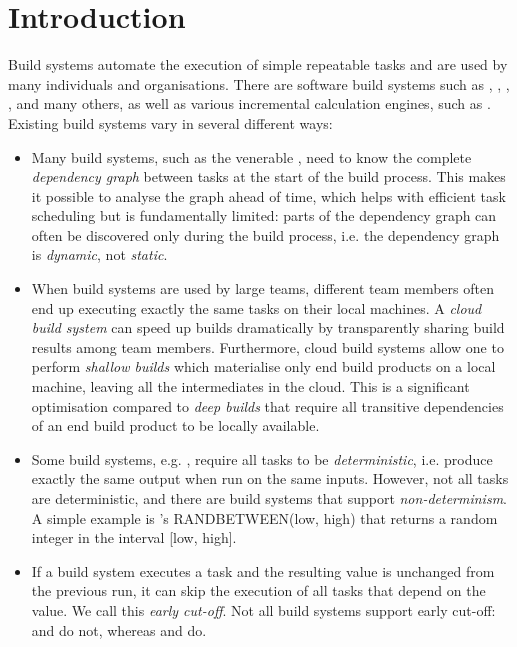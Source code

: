 \section{Introduction}\label{sec-intro}

Build systems automate the execution of simple repeatable tasks and are used by
many individuals and organisations. There are software build systems such as
\Make, \Ninja, \Shake, \Buck, \Bazel and many others, as well as various
incremental calculation engines, such as \Excel. Existing build systems vary in
several different ways:

\begin{itemize}
    \item Many build systems, such as the venerable \Make, need to know the
    complete \emph{dependency graph} between tasks at the start of the build
    process. This makes it possible to analyse the graph ahead of time, which
    helps with efficient task scheduling but is fundamentally limited: parts of
    the dependency graph can often be discovered only during the build process,
    i.e. the dependency graph is \emph{dynamic}, not \emph{static}.

    \item When build systems are used by large teams, different team members
    often end up executing exactly the same tasks on their local machines.
    A \emph{cloud build system} can speed up builds dramatically by
    transparently sharing build results among team members. Furthermore, cloud
    build systems allow one to perform \emph{shallow builds} which materialise
    only end build products on a local machine, leaving all the intermediates
    in the cloud. This is a significant optimisation compared to \emph{deep
    builds} that require all transitive dependencies of an end build product to
    be locally available.

    \item Some build systems, e.g. \Buck, require all tasks to be
    \emph{deterministic}, i.e. produce exactly the same output when run on the
    same inputs. However, not all tasks are deterministic, and there are build
    systems that support \emph{non-determinism}. A simple example is \Excel's
    \textsf{RANDBETWEEN(low, high)} that returns a random integer in the
    interval \textsf{[low, high]}.

    \item If a build system executes a task and the resulting value is unchanged
    from the previous run, it can skip the execution of all tasks that depend on
    the value. We call this \emph{early cut-off}. Not all build systems support
    early cut-off: \Make and \Excel do not, whereas \Shake and \Buck do.


\end{itemize}
